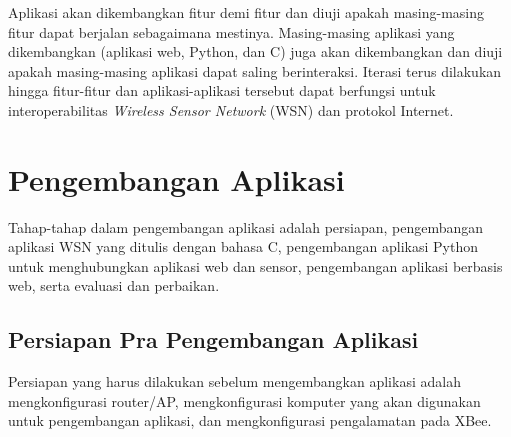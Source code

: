 			Aplikasi akan dikembangkan fitur demi fitur dan diuji apakah masing-masing fitur dapat berjalan sebagaimana mestinya. Masing-masing aplikasi yang dikembangkan (aplikasi web, Python, dan C) juga akan dikembangkan dan diuji apakah masing-masing aplikasi dapat saling berinteraksi. Iterasi terus dilakukan hingga fitur-fitur dan aplikasi-aplikasi tersebut dapat berfungsi untuk interoperabilitas \emph{Wireless Sensor Network} (WSN) dan protokol Internet.
	
	\section{Pengembangan Aplikasi}
		Tahap-tahap dalam pengembangan aplikasi adalah persiapan, pengembangan aplikasi WSN yang ditulis dengan bahasa C, pengembangan aplikasi Python untuk menghubungkan aplikasi web dan sensor, pengembangan aplikasi berbasis web, serta evaluasi dan perbaikan.

		\subsection{Persiapan Pra Pengembangan Aplikasi}
			Persiapan yang harus dilakukan sebelum mengembangkan aplikasi adalah mengkonfigurasi router/AP, mengkonfigurasi komputer yang akan digunakan untuk pengembangan aplikasi, dan mengkonfigurasi pengalamatan pada XBee.


